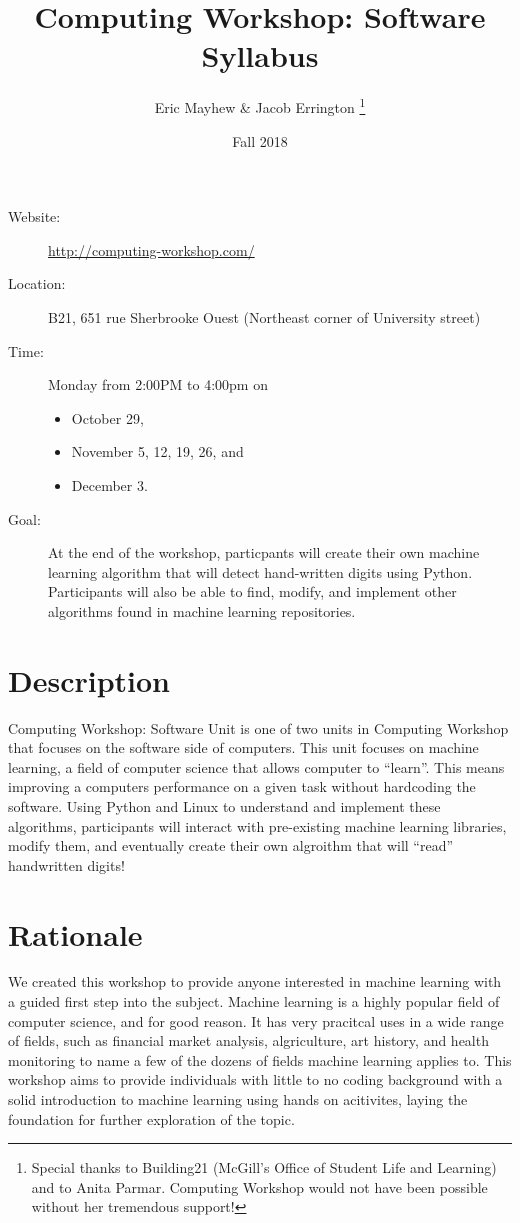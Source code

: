 \documentclass[11pt]{article}
\author{%
  Eric Mayhew \& Jacob Errington%
  \footnote{%
    Special thanks to Building21 (McGill's Office of Student Life and Learning)
    and to Anita Parmar.
    Computing Workshop would not have been possible without her tremendous
    support!
  }
}
\title{Computing Workshop: Software Syllabus}
\date{Fall 2018}
\begin{document}
\maketitle

\begin{description}
  \item[Website:]
    \url{http://computing-workshop.com/}

  \item[Location:]
    B21, 651 rue Sherbrooke Ouest
    (Northeast corner of University street)

  \item[Time:]
    Monday from 2:00PM to 4:00pm on
    \begin{itemize}
    \item October 29,
    \item November 5, 12, 19, 26, and
    \item December 3.
    \end{itemize}

  \item[Goal:]
    At the end of the workshop, particpants will create their own
    machine learning algorithm that will detect hand-written
    digits using Python. Participants will also be able to find, modify, and implement other
    algorithms found in machine learning repositories.

\end{description}

\section*{Description}

Computing Workshop: Software Unit is one of two units in Computing Workshop that
focuses on the software side of computers. This unit focuses on machine
learning, a field of computer science that allows computer to ``learn''. This
means improving a computers performance on a given task without hardcoding the
software. Using Python and Linux to understand and implement these algorithms,
participants will interact with pre-existing machine learning libraries, modify
them, and eventually create their own algroithm that will ``read'' handwritten digits!

\section*{Rationale}

We created this workshop to provide anyone interested in machine learning with a
guided first step into the subject. Machine learning is a highly popular field
of computer science, and for good reason. It has very pracitcal uses in a wide
range of fields, such as financial market analysis, algriculture, art history,
and health monitoring to name a few of the dozens of fields machine learning
applies to. This workshop aims to provide individuals with little to no coding
background with a solid introduction to machine learning using hands on
acitivites, laying the foundation for further exploration of the topic.
\end{document}
